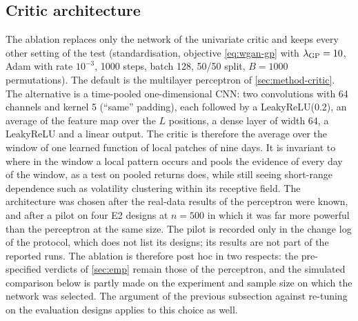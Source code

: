 \begin{table}[tbp]
  \centering
  \caption{Power of the \WC{} test under different optimiser settings (E5 simpower; independent
    windows, $n=500$ windows of $L=20$ per sample, 50 replications per cell, $\alpha=0.05$).}
  \label{tab:e5-simpower}
  \small
\end{table}

\subsection{Critic architecture}

The ablation replaces only the network of the univariate critic and keeps every other setting of
the \WC{} test (standardisation, objective \eqref{eq:wgan-gp} with $\lambda_{\mathrm{GP}}=10$, Adam with rate
$10^{-3}$, 1000 steps, batch 128, 50/50 split, $B=1000$ permutations). The default is the
multilayer perceptron of \cref{sec:method-critic}. The alternative is a time-pooled
one-dimensional CNN: two convolutions with 64 channels and kernel 5 (``same'' padding), each
followed by a LeakyReLU(0.2), an average of the feature map over the $L$ positions, a dense layer
of width 64, a LeakyReLU and a linear output. The critic is therefore the average over the window
of one learned function of local patches of nine days. It is invariant to where in the window a
local pattern occurs and pools the evidence of every day of the window, as a test on pooled
returns does, while still seeing short-range dependence such as volatility clustering within its
receptive field. The architecture was chosen after the real-data results of the perceptron were
known, and after a pilot on four E2 designs at $n=500$ in which it was far more powerful than the
perceptron at the same size. The pilot is recorded only in the change log of the protocol, which
does not list its designs; its results are not part of the reported runs. The ablation is
therefore post hoc in two respects: the pre-specified verdicts of \cref{sec:emp} remain those of
the perceptron, and the simulated comparison below is partly made on the experiment and sample
size on which the network was selected. The argument of the previous subsection against
re-tuning on the evaluation designs applies to this choice as well.


